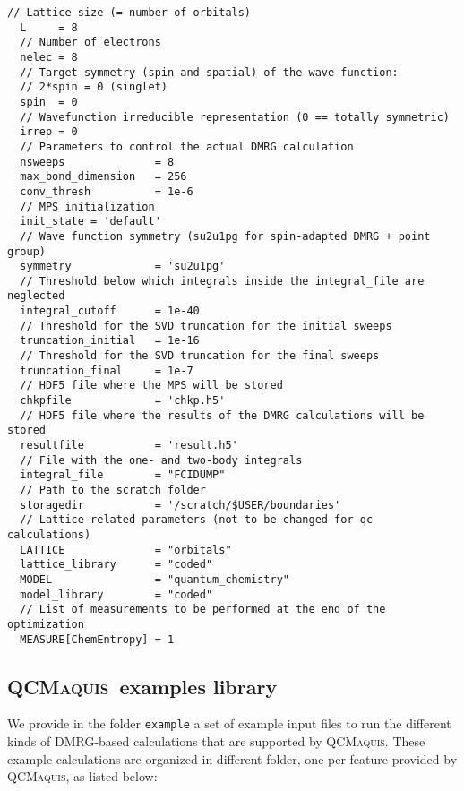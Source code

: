 \documentclass[bibliography=totoc,12pt,a4paper]{scrartcl}
\newcommand{\qcm}{\textsc{QCMaquis}}
\begin{document}
\begin{lstlisting}[language=qcmaquis,caption={Input example for a DMRG-CASCI(8,8) standalone \qcm{} calculation},label=lst:qcm]
  // Lattice size (= number of orbitals)
  L     = 8
  // Number of electrons
  nelec = 8
  // Target symmetry (spin and spatial) of the wave function:
  // 2*spin = 0 (singlet)
  spin  = 0
  // Wavefunction irreducible representation (0 == totally symmetric)
  irrep = 0
  // Parameters to control the actual DMRG calculation
  nsweeps              = 8
  max_bond_dimension   = 256
  conv_thresh          = 1e-6
  // MPS initialization
  init_state = 'default'
  // Wave function symmetry (su2u1pg for spin-adapted DMRG + point group)
  symmetry             = 'su2u1pg'
  // Threshold below which integrals inside the integral_file are neglected
  integral_cutoff      = 1e-40
  // Threshold for the SVD truncation for the initial sweeps
  truncation_initial   = 1e-16
  // Threshold for the SVD truncation for the final sweeps
  truncation_final     = 1e-7
  // HDF5 file where the MPS will be stored
  chkpfile             = 'chkp.h5'
  // HDF5 file where the results of the DMRG calculations will be stored
  resultfile           = 'result.h5'
  // File with the one- and two-body integrals
  integral_file        = "FCIDUMP"
  // Path to the scratch folder
  storagedir           = '/scratch/$USER/boundaries'
  // Lattice-related parameters (not to be changed for qc calculations)
  LATTICE              = "orbitals"
  lattice_library      = "coded"
  MODEL                = "quantum_chemistry"
  model_library        = "coded"
  // List of measurements to be performed at the end of the optimization
  MEASURE[ChemEntropy] = 1
\end{lstlisting}

\subsection{\qcm\ examples library}
\label{sec:examples}

We provide in the folder \texttt{example} a set of example input files to run the different kinds of DMRG-based calculations that are supported by \qcm{}.
These example calculations are organized in different folder, one per feature provided by \qcm, as listed below:
\end{document}
